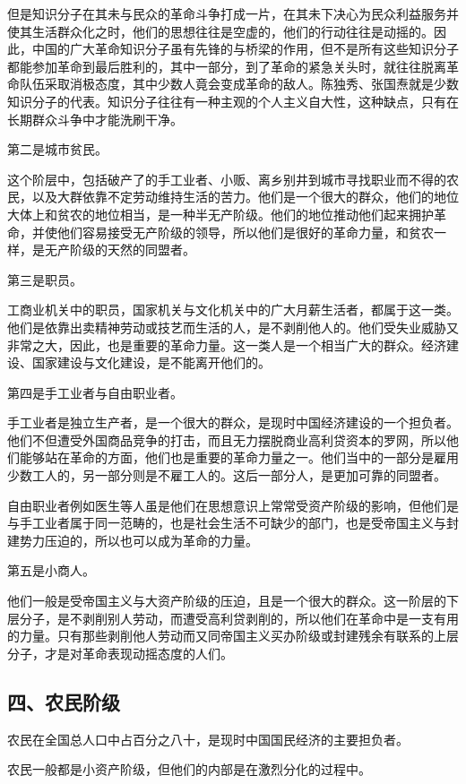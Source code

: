 但是知识分子在其未与民众的革命斗争打成一片，在其未下决心为民众利益服务并使其生活群众化之时，他们的思想往往是空虚的，他们的行动往往是动摇的。因此，中国的广大革命知识分子虽有先锋的与桥梁的作用，但不是所有这些知识分子都能参加革命到最后胜利的，其中一部分，到了革命的紧急关头时，就往往脱离革命队伍采取消极态度，其中少数人竟会变成革命的敌人。陈独秀、张国焘就是少数知识分子的代表。知识分子往往有一种主观的个人主义自大性，这种缺点，只有在长期群众斗争中才能洗刷干净。

第二是城市贫民。

这个阶层中，包括破产了的手工业者、小贩、离乡别井到城市寻找职业而不得的农民，以及大群依靠不定劳动维持生活的苦力。他们是一个很大的群众，他们的地位大体上和贫农的地位相当，是一种半无产阶级。他们的地位推动他们起来拥护革命，并使他们容易接受无产阶级的领导，所以他们是很好的革命力量，和贫农一样，是无产阶级的天然的同盟者。

第三是职员。

工商业机关中的职员，国家机关与文化机关中的广大月薪生活者，都属于这一类。他们是依靠出卖精神劳动或技艺而生活的人，是不剥削他人的。他们受失业威胁又非常之大，因此，也是重要的革命力量。这一类人是一个相当广大的群众。经济建设、国家建设与文化建设，是不能离开他们的。

第四是手工业者与自由职业者。

手工业者是独立生产者，是一个很大的群众，是现时中国经济建设的一个担负者。他们不但遭受外国商品竞争的打击，而且无力摆脱商业高利贷资本的罗网，所以他们能够站在革命的方面，他们也是重要的革命力量之一。他们当中的一部分是雇用少数工人的，另一部分则是不雇工人的。这后一部分人，是更加可靠的同盟者。

自由职业者例如医生等人虽是他们在思想意识上常常受资产阶级的影响，但他们是与手工业者属于同一范畴的，也是社会生活不可缺少的部门，也是受帝国主义与封建势力压迫的，所以也可以成为革命的力量。

第五是小商人。

他们一般是受帝国主义与大资产阶级的压迫，且是一个很大的群众。这一阶层的下层分子，是不剥削别人劳动，而遭受高利贷剥削的，所以他们在革命中是一支有用的力量。只有那些剥削他人劳动而又同帝国主义买办阶级或封建残余有联系的上层分子，才是对革命表现动摇态度的人们。

\subsection{四、农民阶级}

农民在全国总人口中占百分之八十，是现时中国国民经济的主要担负者。

农民一般都是小资产阶级，但他们的内部是在激烈分化的过程中。

